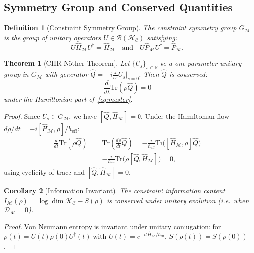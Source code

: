 \documentclass[twocolumn,aps,prd,superscriptaddress,nofootinbib]{revtex4-2}
\newtheorem{theorem}{Theorem}[section]
\newtheorem{corollary}[theorem]{Corollary}
\newtheorem{definition}{Definition}[section]
\newcommand{\HC}{\mathcal{H}_{\mathcal{C}}}
\newcommand{\CM}{\mathcal{M}}
\newcommand{\CD}{\mathcal{D}}
\newcommand{\CB}{\mathcal{B}}
\newcommand{\hatH}{\hat{H}}
\newcommand{\hatP}{\hat{P}}
\newcommand{\Tr}{\mathrm{Tr}}
\begin{document}
\subsection{Symmetry Group and Conserved Quantities}

\begin{definition}[Constraint Symmetry Group]
\label{def:symgroup}
The \emph{constraint symmetry group} $G_\CM$ is the group of unitary operators
$U \in \CB(\HC)$ satisfying:
\[
  U\hatH_\CM U^\dagger = \hatH_\CM \quad \text{and} \quad
  U\hatP_\CM U^\dagger = \hatP_\CM.
\]
\end{definition}

\begin{theorem}[CIIR N{\"o}ther Theorem]
\label{thm:noether}
Let $\{U_s\}_{s\in\mathbb{R}}$ be a one-parameter unitary group in $G_\CM$
with generator $\hat{Q} = -i \frac{d}{ds}U_s\big|_{s=0}$.  Then $\hat{Q}$ is
conserved:
\begin{equation}
  \frac{d}{dt}\Tr(\rho\hat{Q}) = 0
  \label{eq:noether}
\end{equation}
under the Hamiltonian part of~\eqref{eq:master}.
\end{theorem}

\begin{proof}
Since $U_s \in G_\CM$, we have $[\hat{Q}, \hatH_\CM] = 0$.  Under the
Hamiltonian flow $d\rho/dt = -i[\hatH_\CM,\rho]/\hbar_\mathrm{eff}$:
\begin{align}
\frac{d}{dt}\Tr(\rho\hat{Q})
  &= \Tr\!\left(\frac{d\rho}{dt}\hat{Q}\right)
   = -\frac{i}{\hbar_\mathrm{eff}}\Tr\bigl([\hatH_\CM,\rho]\hat{Q}\bigr) \nonumber\\
  &= -\frac{i}{\hbar_\mathrm{eff}}\Tr\bigl(\rho[\hat{Q},\hatH_\CM]\bigr) = 0,
\end{align}
using cyclicity of trace and $[\hat{Q},\hatH_\CM]=0$.
\end{proof}

\begin{corollary}[Information Invariant]
\label{cor:invariant}
The \emph{constraint information content}
$I_\CM(\rho) = \log\dim\HC - S(\rho)$ is conserved under unitary evolution
(i.e.\ when $\CD_\CM = 0$).
\end{corollary}

\begin{proof}
Von Neumann entropy is invariant under unitary conjugation: for $\rho(t) = U(t)\rho(0)U^\dagger(t)$ with $U(t) = e^{-it\hatH_\CM/\hbar_\mathrm{eff}}$, $S(\rho(t)) = S(\rho(0))$.
\end{proof}
\end{document}
